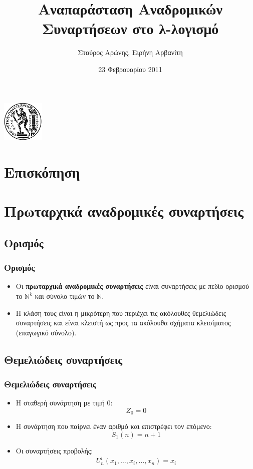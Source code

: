 \documentclass{beamer}
\title[Αναδρομικές Συναρτήσεις στο λ-λογισμό]
      {Αναπαράσταση Αναδρομικών Συναρτήσεων στο λ-λογισμό}
\author{Σταύρος Αρώνης, Ειρήνη Αρβανίτη}
\date{23 Φεβρουαρίου 2011}
\institute{Εφαρμογές της λογικής στην Πληροφορική\\Σχολή ΗΜΜΥ, ΕΜΠ}
\begin{document}
\begin{frame}
  \titlepage
  \begin{center}
    \includegraphics[height=2cm]{pyrforos.png}
  \end{center}
\end{frame}

\section*{Επισκόπηση}

\begin{frame}
  \tableofcontents[hidesubsections]
\end{frame}

\section{Πρωταρχικά αναδρομικές συναρτήσεις}

\subsection{Ορισμός}

\begin{frame}
  \frametitle{Ορισμός}
  \begin{itemize}
  \item Οι \textbf{πρωταρχικά αναδρομικές συναρτήσεις} είναι
    συναρτήσεις με πεδίο ορισμού το $\mathbb{N}^k$ και σύνολο τιμών το
    $\mathbb{N}$.\pause
  \item Η κλάση τους είναι η μικρότερη που περιέχει τις ακόλουθες
    θεμελιώδεις συναρτήσεις και είναι κλειστή ως προς τα ακόλουθα
    σχήματα κλεισίματος (επαγωγικό σύνολο).
  \end{itemize}
\end{frame}

\subsection{Θεμελιώδεις συναρτήσεις}

\begin{frame}
  \frametitle{Θεμελιώδεις συναρτήσεις}
  \begin{itemize}
  \item Η σταθερή συνάρτηση με τιμή 0: $$Z_0=0$$
  \item Η συνάρτηση που παίρνει έναν αριθμό και επιστρέφει τον
    επόμενο: $$S_1(n)=n+1$$
  \item Οι συναρτήσεις
    προβολής: $$U^i_n(x_1,\ldots,x_i,\ldots,x_n)=x_i$$
  \end{itemize}
\end{frame}
\end{document}
